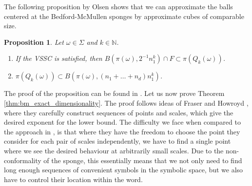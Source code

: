 \documentclass{PRM}
\newcommand{\field}[1]{\mathbb{#1}}
\newcommand{\N}{\field{N}}
\theoremstyle{plain}
\newtheorem{prop}[thm]{Proposition}
\theoremstyle{definition}
\theoremstyle{remark}
\begin{document}
The following proposition by Olsen shows that we can approximate the balls centered at the Bedford-McMullen sponges by approximate cubes of comparable size.

\begin{prop}\label{prop:olsenvssc}
Let $\omega\in\Sigma$ and $k\in\N$.
\begin{enumerate}
    \item If the VSSC is satisfied, then $B(\pi(\omega),2^{-1}n_1^k)\cap F\subset \pi(Q_k(\omega))$.
    \item  $\pi(Q_k(\omega))\subset B(\pi(\omega),(n_1+\ldots+n_d)n_1^k)$.
\end{enumerate}
\end{prop}
The proof of the proposition can be found in \cite[Proposition 6.2.1]{O}. Let us now prove Theorem \ref{thm:bm_exact_dimensionality}. The proof follows ideas of Fraser and Howroyd \cite[Theorem 2.6]{FH}, where they carefully construct sequences of points and scales, which give the desired exponent for the lower bound. The difficulty we face when compared to the approach in \cite{FH}, is that where they have the freedom to choose the point they consider for each pair of scales independently, we have to find a single point where we see the desired behaviour at arbitrarily small scales. Due to the non-conformality of the sponge, this essentially means that we not only need to find long enough sequences of convenient symbols in the symbolic space, but we also have to control their location within the word.
\end{document}
